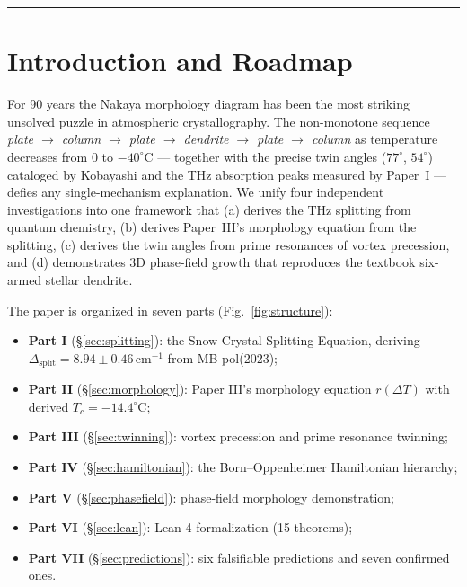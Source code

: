 \documentclass[11pt,a4paper]{article}
\begin{document}
\tableofcontents

\vspace{12pt}\hrule

\section{Introduction and Roadmap}

For 90 years the Nakaya morphology diagram \cite{NakayaBook} has been the most striking unsolved puzzle in atmospheric crystallography. The non-monotone sequence \emph{plate $\to$ column $\to$ plate $\to$ dendrite $\to$ plate $\to$ column} as temperature decreases from $0$ to $-40^\circ$C — together with the precise twin angles ($77^\circ$, $54^\circ$) cataloged by Kobayashi \cite{Kobayashi1976} and the THz absorption peaks measured by Paper~I — defies any single-mechanism explanation. We unify four independent investigations into one framework that (a) derives the THz splitting from quantum chemistry, (b) derives Paper~III's morphology equation from the splitting, (c) derives the twin angles from prime resonances of vortex precession, and (d) demonstrates 3D phase-field growth that reproduces the textbook six-armed stellar dendrite.

The paper is organized in seven parts (Fig.~\ref{fig:structure}):

\begin{itemize}[leftmargin=*]
\item \textbf{Part I} (\S\ref{sec:splitting}): the Snow Crystal Splitting Equation, deriving $\Delta_\text{split} = 8.94 \pm 0.46$\,cm$^{-1}$ from MB-pol(2023);
\item \textbf{Part II} (\S\ref{sec:morphology}): Paper III's morphology equation $r(\Delta T)$ with derived $T_c = -14.4^\circ$C;
\item \textbf{Part III} (\S\ref{sec:twinning}): vortex precession and prime resonance twinning;
\item \textbf{Part IV} (\S\ref{sec:hamiltonian}): the Born–Oppenheimer Hamiltonian hierarchy;
\item \textbf{Part V} (\S\ref{sec:phasefield}): phase-field morphology demonstration;
\item \textbf{Part VI} (\S\ref{sec:lean}): Lean 4 formalization (15 theorems);
\item \textbf{Part VII} (\S\ref{sec:predictions}): six falsifiable predictions and seven confirmed ones.
\end{itemize}
\end{document}
